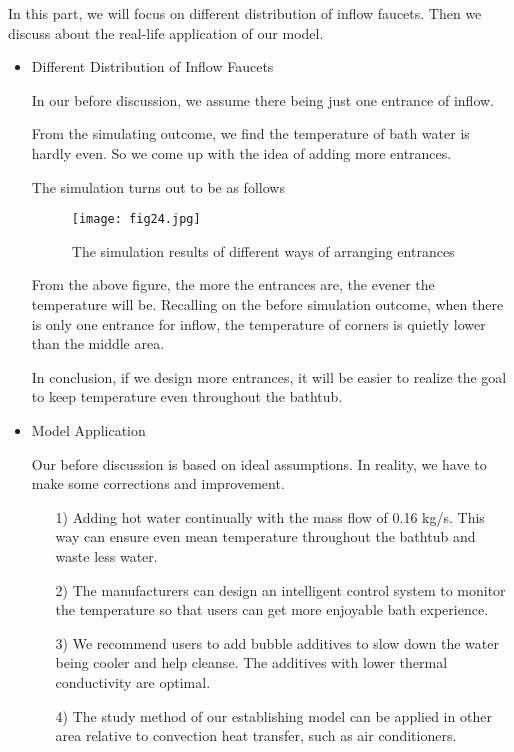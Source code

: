 \documentclass{mcmthesis}
\begin{document}
In this part, we will focus on different distribution of inflow faucets. Then we discuss about the real-life application of our model.

\begin{itemize}[leftmargin=*]
\item Different Distribution of Inflow Faucets

In our before discussion, we assume there being just one entrance of inflow.

From the simulating outcome, we find the temperature of bath water is hardly even. So we come up with the idea of adding more entrances.

The simulation turns out to be as follows

\begin{figure}[h] 
\centering
\texttt{[image: fig24.jpg]}
\caption{The simulation results of different ways of arranging entrances} \label{fig24}
\end{figure}

From the above figure, the more the entrances are, the evener the temperature will be. Recalling on the before simulation outcome, when there is only one entrance for inflow, the temperature of corners is quietly lower than the middle area.

In conclusion, if we design more entrances, it will be easier to realize the goal to keep temperature even throughout the bathtub.

\item Model Application

Our before discussion is based on ideal assumptions. In reality, we have to make some corrections and improvement.

\begin{itemize}[leftmargin=*]
\item[1)] Adding hot water continually with the mass flow of 0.16 kg/s. This way can ensure even mean temperature throughout the bathtub and waste less water.

\item[2)] The manufacturers can design an intelligent control system to monitor the temperature so that users can get more enjoyable bath experience.

\item[3)] We recommend users to add bubble additives to slow down the water being cooler and help cleanse. The additives with lower thermal conductivity are optimal.

\item[4)] The study method of our establishing model can be applied in other area relative to convection heat transfer, such as air conditioners.
\end{itemize}
\end{itemize}
\end{document}
